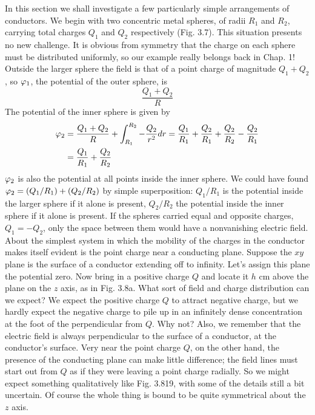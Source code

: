 In this section we shall investigate a few particularly simple arrangements
of conductors. We begin with two concentric metal
spheres, of radii $R_1$ and $R_2$, carrying total charges $Q_1$ and $Q_2$ respectively
(Fig. 3.7). This situation presents no new challenge. It is
obvious from symmetry that the charge on each sphere must be distributed
uniformly, so our example really belongs back in Chap. 1!
Outside the larger sphere the field is that of a point charge of magnitude
$Q_1 + Q_2$, so $\varphi_1$, the potential of the outer sphere, is
\begin{equation*}
  \frac{Q_1+Q_2}{R}
\end{equation*}
The potential of the inner sphere is given by
\begin{align}
\begin{split}
  \varphi_2 &= \frac{Q_1+Q_2}{R} + \int_{R_1}^{R_2} -\frac{Q_2}{r^2}d r
         = \frac{Q_1}{R_1}+\frac{Q_2}{R_1}+\frac{Q_2}{R_2}-\frac{Q_2}{R_1} \\
       &=\frac{Q_1}{R_1}+\frac{Q_2}{R_2}
\end{split}
\end{align}
$\varphi_2$ is also the potential at all points inside the inner sphere. We could
have found $\varphi_2 = (Q_1/R_1) + (Q_2/R_2)$ by simple superposition:
$Q_1/R_1$ is the potential inside the larger sphere if it alone is present,
$Q_2/R_2$ the potential inside the inner sphere if it alone is present. If
the spheres carried equal and opposite charges, $Q_1 = - Q_2$, only the
space between them would have a nonvanishing electric field.
About the simplest system in which the mobility of the charges in
the conductor makes itself evident is the point charge near a conducting
plane. Suppose the $xy$ plane is the surface of a conductor
extending off to infinity. Let's assign this plane the potential zero.
Now bring in a positive charge $Q$ and locate it $h$ cm above the plane
on the $z$ axis, as in Fig. 3.8a. What sort of field and charge distribution
can we expect? We expect the positive charge $Q$ to attract negative
charge, but we hardly expect the negative charge to pile up in an
infinitely dense concentration at the foot of the perpendicular from $Q$.
Why not? Also, we remember that the electric field is always perpendicular
to the surface of a conductor, at the conductor's surface.
Very near the point charge $Q$, on the other hand, the presence of the
conducting plane can make little difference; the field lines must start
out from $Q$ as if they were leaving a point charge radially. So we
might expect something qualitatively like Fig. 3.819, with some of the
details still a bit uncertain. Of course the whole thing is bound to
be quite symmetrical about the $z$ axis.

